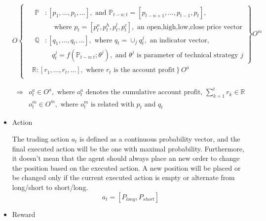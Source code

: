 \begin{itemize}
$$
O
\left\{
\begin{aligned}
&\left.
\begin{aligned}
\mathbb{P} &: [p_1,...,p_t,...], \text{ and }\mathbb{P}_{t-n:t} = [p_{t-n+1},...,p_{t-1},p_t], \\
&\quad  \text{ where } p_t=[p^o_t, p^h_t, p^l_t, p^c_t], \text{ an open,high,low,close price vector}\\
\mathbb{Q} &: [q_1,...,q_t,...], \text{ where } q_t = \cup_j q_t^j,  \text{ an indicator vector},\\
&\quad q_t^j=f(\mathbb{P}_{t-n:t};\theta^j), \text{ and }\theta^j \text{ is parameter of technical strategy }j 
\end{aligned}
\right\}O^m\\
&\left.\mathbb{R} : [r_1,...,r_t,...], \text{ where $r_t$ is the account profit}\right\}O^a \\
\end{aligned}\right.
$$

$$
\begin{aligned}
\Rightarrow & o^a_t \in O^a, \text{ where } o^a_t \text{ denotes the cumulative account profit, } \sum_{k=1}^t r_k \in \mathbb{R}\\
&o^m_t \in O^m, \text{ where } o^m_t \text{ is related with $p_t$ and $q_t$}
\end{aligned}
$$

\item Action

The trading action $a_t$ is defined as a continuous probability vector, and the final executed action will be the one with maximal probability. Furthermore, it doesn't mean that the agent should always place an new order to change the position based on the executed action. A new position will be placed or be changed only if the current executed action is empty or alternate from long/short to short/long.
$$
a_t = [P_{long}, P_{short}]
$$

\item Reward


\end{itemize}
